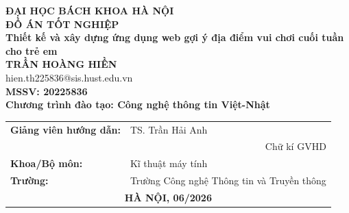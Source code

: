 \documentclass[DoAn.tex]{subfiles}
\begin{document}
\begin{titlepage}
\thispagestyle{empty}
\begin{center}

{\textbf{\large{ĐẠI HỌC BÁCH KHOA HÀ NỘI}}}\\[3cm]

{\textbf{\huge{ĐỒ ÁN TỐT NGHIỆP}}}\\[1cm]
{\textbf{\Large{Thiết kế và xây dựng ứng dụng web gợi ý địa điểm vui chơi cuối tuần cho trẻ em}}}\\[1cm]

{\textbf{\large{TRẦN HOÀNG HIỀN}}}\\
{\large{hien.th225836@sis.hust.edu.vn}}\\[0.5cm]
{\textbf{\large{MSSV: 20225836}}}\\[0.5cm]
{\textbf{\large{Chương trình đào tạo: Công nghệ thông tin Việt-Nhật}}}\\

\vspace{2.8cm}
\begin{table}[H]
\centering
\begin{tabular}{p{6cm}p{8cm}}
\textbf{Giảng viên hướng dẫn:} & TS. Trần Hải Anh \hspace{0.5cm} \underline{\hspace{3cm}} \\[0.5cm]
  & \multicolumn{1}{r}{Chữ kí GVHD} \\[0.5cm]
\textbf{Khoa/Bộ môn:} & Kĩ thuật máy tính \\[0.5cm]
\textbf{Trường:} & Trường Công nghệ Thông tin và Truyền thông \\[2.5cm]
\multicolumn{2}{c}{\textbf{HÀ NỘI, 06/2026}}
\end{tabular}
\end{table}
\end{center}
\end{titlepage}
\end{document}
